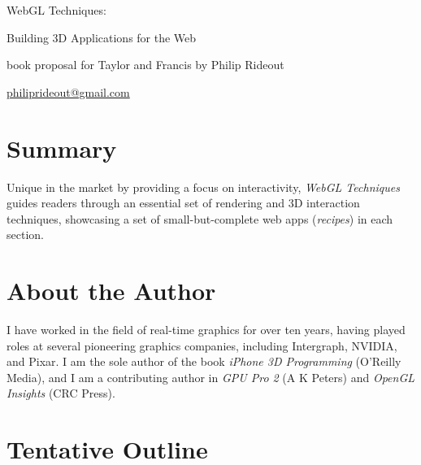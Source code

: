 \thispagestyle{empty}
\label{Proposal}
\LARGE
\noindent WebGL Techniques:

\large
\noindent Building 3D Applications for the Web
\small

\vspace{0.25in}
\noindent book proposal for Taylor and Francis by Philip Rideout

\noindent \href{mailto:philiprideout@gmail.com}{philiprideout@gmail.com}
\normalsize

\section*{Summary}
Unique in the market by providing a focus on interactivity, \emph{WebGL Techniques} guides readers through an essential set of rendering and 3D interaction techniques, showcasing a set of small-but-complete web apps (\emph{recipes}) in each section.

\section*{About the Author}

I have worked in the field of real-time graphics for over ten years, having played roles at several pioneering graphics companies, including Intergraph, NVIDIA, and Pixar.  I am the sole author of the book \emph{iPhone 3D Programming} (O'Reilly Media), and I am a contributing author in \emph{GPU Pro 2} (A K Peters) and \emph{OpenGL Insights} (CRC Press).

\section*{Tentative Outline}

